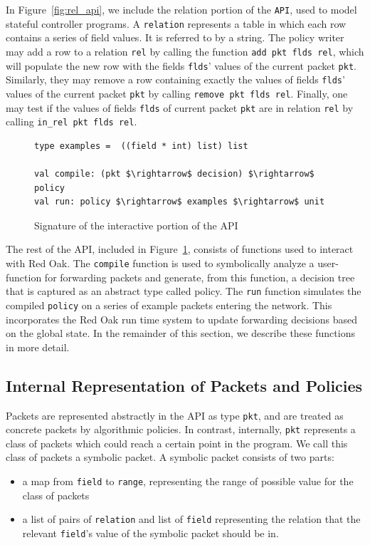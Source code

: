 \documentclass[preprint]{sigplanconf}
\begin{document}
In Figure~\ref{fig:rel_api}, we include the relation portion of the \lstinline|API|, used to model stateful controller programs. A \lstinline|relation| represents a table in which each row contains a series of field values. It is referred to by a string. The policy writer may add a row to a relation \lstinline|rel| by calling the function \lstinline|add pkt flds rel|, which will populate the new row with the fields \lstinline|flds|' values of the current packet \lstinline|pkt|. Similarly, they may remove a row containing exactly the values of fields \lstinline|flds|' values of the current packet \lstinline|pkt| by calling \lstinline|remove pkt flds rel|. Finally, one may test if the values of fields \lstinline|flds| of current packet \lstinline|pkt| are in relation \lstinline|rel| by calling \lstinline|in_rel pkt flds rel|.


\begin{figure}[ht]
  \begin{lstlisting}[mathescape]
type examples =  ((field * int) list) list
  
val compile: (pkt $\rightarrow$ decision) $\rightarrow$ policy
val run: policy $\rightarrow$ examples $\rightarrow$ unit
  \end{lstlisting}

  \caption{Signature of the interactive portion of the API}
  \label{fig:build_api}
\end{figure}


The rest of the API, included in Figure~\ref{fig:build_api}, consists of functions used to interact with Red Oak. The \lstinline|compile| function is used to symbolically analyze a user-function for forwarding packets and generate, from this function, a decision tree that is captured as an abstract type called policy. The \lstinline|run| function simulates the compiled \lstinline|policy| on a series of example packets entering the network. This incorporates the Red Oak run time system to update forwarding decisions based on the global state. In the remainder of this section, we describe these functions in more detail.

\subsection*{Internal Representation of Packets and Policies}

Packets are represented abstractly in the API as type \lstinline|pkt|, and are treated as concrete packets by algorithmic policies. In contrast, internally, \lstinline|pkt| represents a class of packets which could reach a certain point in the program. We call this class of packets a symbolic packet.
A symbolic packet consists of two parts:
\begin{itemize}
\item a map from \lstinline|field| to \lstinline|range|, representing the range of possible value for the class of packets
  \item a list of pairs of \lstinline|relation| and list of \lstinline|field| representing the relation that the relevant \lstinline|field|'s value of the symbolic packet should be in. 
  \end{itemize}
  
\end{document}

